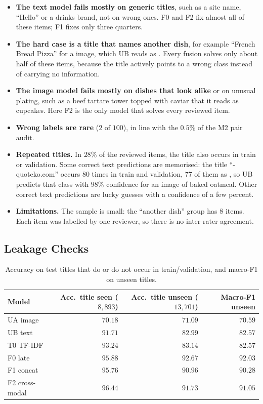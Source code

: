 \begin{itemize}
  \item \textbf{The text model fails mostly on generic titles}, such as a site name, ``Hello'' or a drinks brand,
        not on wrong ones. F0 and F2 fix almost all of these items; F1 fixes only three quarters.
  \item \textbf{The hard case is a title that names another dish}, for example ``French Bread Pizza'' for a
         image, which UB reads as . Every fusion solves only about half of these
        items, because the title actively points to a wrong class instead of carrying no information.
  \item \textbf{The image model fails mostly on dishes that look alike} or on unusual plating, such as a beef
        tartare tower topped with caviar that it reads as cupcakes. Here F2 is the only model that solves every
        reviewed item.
  \item \textbf{Wrong labels are rare} ($2$ of $100$), in line with the $0.5\%$ of the M2 pair audit.
  \item \textbf{Repeated titles.} In $28\%$ of the reviewed items, the title also occurs in train or
        validation. Some correct text predictions are memorised: the title ``- quoteko.com'' occurs $80$ times in
        train and validation, $77$ of them as , so UB predicts that class with $98\%$
        confidence for an image of baked oatmeal. Other correct text predictions are lucky guesses with a
        confidence of a few percent.
  \item \textbf{Limitations.} The sample is small: the ``another dish'' group has $8$ items. Each item was labelled
        by one reviewer, so there is no inter-rater agreement.
\end{itemize}

\subsection{Leakage Checks}
\label{sec:leakage}

\begin{table}[H]
  \centering\small
  \caption{Accuracy on test titles that do or do not occur in train/validation, and macro-F1 on unseen titles.}
  \label{tab:leakage}
  \begin{tabular}{@{}lrrr@{}}
    \toprule
    Model & Acc.\ title seen ($8{,}893$) & Acc.\ title unseen ($13{,}701$) & Macro-F1 unseen \\
    \midrule
    UA image  & $70.18$ & $71.09$ & $70.59$ \\
    UB text   & $91.71$ & $82.99$ & $82.57$ \\
    T0 TF-IDF & $93.24$ & $83.14$ & $82.57$ \\
    F0 late   & $95.88$ & $92.67$ & $\mathbf{92.03}$ \\
    F1 concat & $95.76$ & $90.96$ & $90.28$ \\
    F2 cross-modal & $96.44$ & $91.73$ & $91.05$ \\
    \bottomrule
  \end{tabular}
\end{table}

